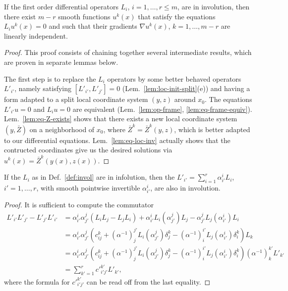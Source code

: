 \begin{theorem} \label{thm:frob-loc}
If the first order differential operators $L_i$, $i=1,\ldots,r \le m$, are in
involution, then there exist $m-r$ smooth functions $u^k(x)$ that satisfy the
equations $L_i u^k(x) = 0$ and such that their gradients $\nabla u^k(x)$,
$k=1,\ldots,m-r$ are linearly independent.
\end{theorem}
\begin{proof}
This proof consists of chaining together several intermediate results, which are
proven in separate lemmas below.

The first step is to replace the $L_i$ operators by some better behaved
operators $L'_{i'}$, namely satisfying $[L'_{i'}, L'_{j'}] = 0$
(Lem.~\ref{lem:loc-init-split}(e)) and having a form adapted to a split local
coordinate system $(y,z)$ around $x_0$. The equations $L'_{i'} u = 0$ and $L_i u
= 0$ are equivalent (Lem.~\ref{lem:op-frame}, \ref{lem:eq-frame-equiv}).
Lem.~\ref{lem:eq-Z-exists} shows that there exists a new local coordinate system
$(y,\bar{Z})$ on a neighborhood of $x_0$, where $\bar{Z}^k=\bar{Z}^k(y,z)$,
which is better adapted to our differential equations. Lem.~\ref{lem:eq-loc-inv}
actually shows that the contructed coordinates give us the desired solutions via
$u^k(x) = \bar{Z}^k(y(x),z(x))$.
\end{proof}

\begin{lemma} \label{lem:op-frame}
If the $L_i$ as in Def.~\ref{def:invol} are in infolution, then the $L'_{i'} =
\sum_{i=1}^r \alpha_{i'}^i L_i$, $i'=1,\ldots,r$, with smooth pointwise invertible
$\alpha_{i'}^i$, are also in involution.
\end{lemma}
\begin{proof}
It is sufficient to compute the commutator
\begin{align*}
  L'_{i'} L'_{j'} - L'_{j'} L'_{i'}
  &= \alpha_{i'}^i \alpha_{j'}^j (L_i L_j - L_j L_i)
    + \alpha_{i'}^i L_i(\alpha_{j'}^j) L_j
    - \alpha_{j'}^j L_j(\alpha_{i'}^i) L_i
  \\
  &= \alpha_{i'}^i \alpha_{j'}^j \left(c_{ij}^k
    + (\alpha^{-1})_j^{j'} L_i(\alpha_{j'}^j) \delta_j^k
    - (\alpha^{-1})_i^{i'} L_j(\alpha_{i'}^i) \delta_i^k \right) L_k
  \\
  &= \alpha_{i'}^i \alpha_{j'}^j \left(c_{ij}^k
    + (\alpha^{-1})_j^{j'} L_i(\alpha_{j'}^j) \delta_j^k
    - (\alpha^{-1})_i^{i'} L_j(\alpha_{i'}^i) \delta_i^k \right) (\alpha^{-1})_k^{k'} L'_{k'}
  \\
  &= \sum_{k'=1}^r c'^{k'}_{i'j'} L'_{k'} ,
\end{align*}
where the formula for $c'^{k'}_{i'j'}$ can be read off from the last equality.
\end{proof}

